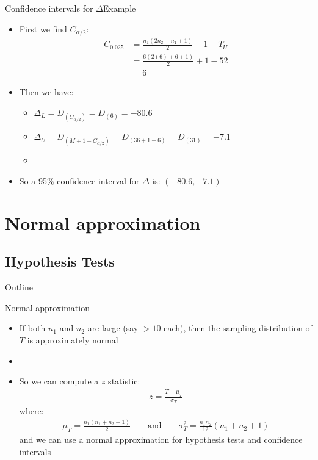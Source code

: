 \documentclass[xcolor=dvipsnames]{beamer}
\begin{document}
\begin{frame}{Confidence intervals for $\Delta$}{Example}
	\begin{itemize}
		\item First we find $C_{\alpha/2}$:
		\begin{align*}
		C_{0.025} &= \frac{n_1 (2n_2 + n_1 + 1)}{2} + 1 - T_U \\
		&= \frac{6 (2(6) + 6 + 1)}{2} + 1 - 52 \\
		&= 6
		\end{align*}
		\item Then we have:
		\begin{itemize}
			\item $\Delta_L = D_{(C_{\alpha / 2})} = D_{(6)} = -80.6$
			\item $\Delta_U = D_{(M + 1 - C_{\alpha / 2})} = D_{(36 +1 - 6)} =D_{(31)} = -7.1$
			\item[]
		\end{itemize}
	\item So a 95\% confidence interval for $\Delta$ is: $(-80.6, -7.1)$
	\end{itemize}
\end{frame}

\section{Normal approximation}
\subsection{Hypothesis Tests}
\begin{frame}{Outline}
\tableofcontents[currentsection,subsectionstyle=show/shaded/hide]
\end{frame}

\begin{frame}{Normal approximation}
	\begin{itemize}
		\item If both $n_1$ and $n_2$ are large (say $>10$ each), then the sampling distribution of $T$ is approximately normal
		\item[]
		\item So we can compute a $z$ statistic:
		\begin{gather*}
		z = \frac{T- \mu_T}{\sigma_T}
		\end{gather*}
		where:
		\begin{gather*}
		\mu_T = \frac{n_1 (n_1 + n_2 + 1)}{2} \quad \quad \text{and} \quad \quad \sigma_T^{2} = \frac{n_1 n_2}{12}(n_1 +n_2 +1)
		\end{gather*}
		and we can use a normal approximation for hypothesis tests and confidence intervals
	\end{itemize}
\end{frame}
\end{document}
